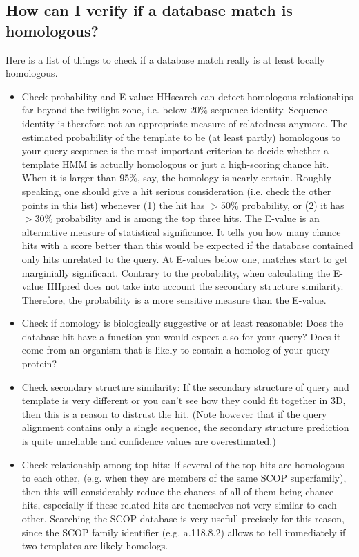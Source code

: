 \documentclass[11pt,a4paper]{article}
\begin{document}
\subsection{How can I verify if a database match is homologous?}

Here is a list of things to check if a database match really is at least locally homologous.
 
\begin{itemize}

\item{Check probability and E-value: HHsearch can detect homologous relationships far beyond the twilight zone, i.e. below 20\% sequence identity. Sequence identity is therefore not an appropriate measure of relatedness anymore. The estimated probability of the template to be (at least partly) homologous to your query sequence is the most important criterion to decide whether a template HMM is actually homologous or just a high-scoring chance hit. When it is larger than 95\%, say, the homology is nearly certain. Roughly speaking, one should give a hit serious consideration (i.e. check the other points in this list) whenever (1) the hit has $>50\%$ probability, or (2) it has $>30\%$ probability and is among the top three hits. The E-value is an alternative measure of statistical significance. It tells you how many chance hits with a score better than this would be expected if the database contained only hits unrelated to the query. At E-values below one, matches start to get marginially significant. Contrary to the probability, when calculating the E-value HHpred does not take into account the secondary structure similarity. Therefore, the probability is a more sensitive measure than the E-value.}

\item{Check if homology is biologically suggestive or at least reasonable: Does the database hit have a function you would expect also for your query? Does it come from an organism that is likely to contain a homolog of your query protein?}

\item{Check secondary structure similarity: If the secondary structure of query and template is very different or you can't see how they could fit together in 3D, then this is a reason to distrust the hit. (Note however that if the query alignment contains only a single sequence, the secondary structure prediction is quite unreliable and confidence values are overestimated.)}

\item{Check relationship among top hits: If several of the top hits are homologous to each other, (e.g. when they are members of the same SCOP superfamily), then this will considerably reduce the chances of all of them being chance hits, especially if these related hits are themselves not very similar to each other. Searching the SCOP database is very usefull precisely for this reason, since the SCOP family identifier (e.g. a.118.8.2) allows to tell immediately if two templates are likely homologs.}


\end{itemize}
\end{document}
